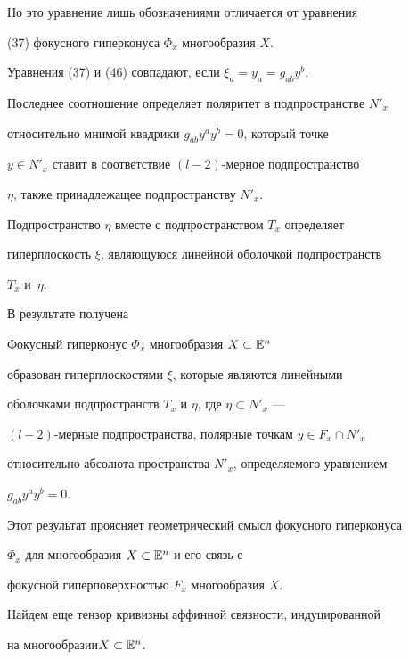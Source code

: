 Но это уравнение лишь обозначениями отличается от уравнения


(37) фокусного гиперконуса $\Phi_x$ многообразия $X$.


Уравнения (37) и (46) совпадают, если $\xi_a = y_a = g_{ab} y^b$.





Последнее соотношение определяет поляритет в подпространстве $N'_x$


относительно мнимой квадрики $g_{ab} y^a y^b=0$, который точке


$y\in N'_x$ ставит в соответствие $(l-2)$-мерное подпространство


$\eta$, также принадлежащее подпространству $N'_x$.


 Подпространство $\eta$ вместе с подпространством $T_x$ определяет


гиперплоскость $\xi$, являющуюся линейной оболочкой подпространств


$T_x$ и~$\eta$.





В результате получена





\begin{thm}


Фокусный гиперконус $\Phi_x$ многообразия $X \subset \Bbb{E}^n$


образован гиперплоскостями $\xi$, которые являются линейными


оболочками подпространств $T_x$ и $\eta$, где $\eta\subset N'_x$ ---


$(l-2)$-мерные подпространства, полярные точкам $y\in F_x \cap N'_x$


относительно абсолюта пространства $N'_x$, определяемого уравнением


$g_{ab} y^a y^b=0$.


\end{thm}

Этот результат проясняет геометрический смысл фокусного гиперконуса


$\Phi_x$ для многообразия $X \subset \Bbb{E}^n$ и его связь с


фокусной гиперповерхностью $F_x$ многообразия $X$.





 Найдем еще тензор кривизны аффинной связности, индуцированной


на многообразии\linebreak $X \subset \Bbb{E}^n$.


